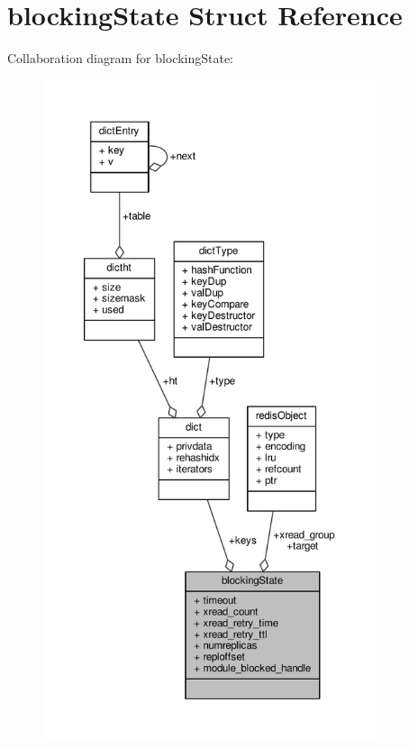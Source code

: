 \hypertarget{structblockingState}{}\section{blocking\+State Struct Reference}
\label{structblockingState}


Collaboration diagram for blocking\+State\+:\nopagebreak
\begin{figure}[H]
\begin{center}
\leavevmode
\includegraphics[height=550pt]{structblockingState__coll__graph}
\end{center}
\end{figure}
